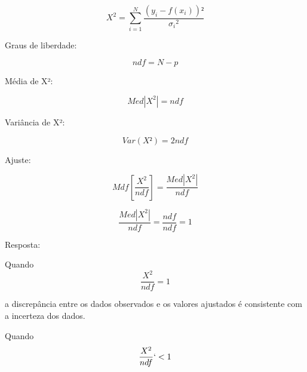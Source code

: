 \documentclass{article}
\begin{document}
    {\Large 
       \[ X^2 = \sum_{i=1}^N \frac {(y_i  - f(x_i))²}{ {\sigma_i}^2 } \]

       \vspace{0.5cm}

       Graus de liberdade:

       \vspace{0.5cm}

       \[ndf = N - p\]

       \vspace{0.5cm}

       Média de X²:

       \vspace{0.5cm}
       
       \[Med|X^2| = ndf\]

       \vspace{0.5cm}

       Variância de X²:

       \vspace{0.5cm}

       \[Var(X²) = 2ndf\]

       \vspace{0.5cm}

       Ajuste:

       \vspace{0.5cm}

       \[Mdf \left[ \frac{X^2}{ndf} \right] = \frac{Med|X^2|}{ndf}\]

       \vspace{0.5cm}

       \[\frac{Med|X^2|}{ndf} = \frac{ndf}{ndf}=1\]

       \vspace{9cm}

       Resposta:

       \vspace{1cm}

       Quando \[ \frac{X^2}{ndf} = 1\]

       \vspace{1cm}
       
       a discrepância entre os dados observados e os valores ajustados é consistente com a incerteza dos dados.

       \vspace{1cm}

        Quando \[ \frac{X^2}{ndf} `< 1\] 
        
        \vspace{1cm}
        
}
\end{document}
